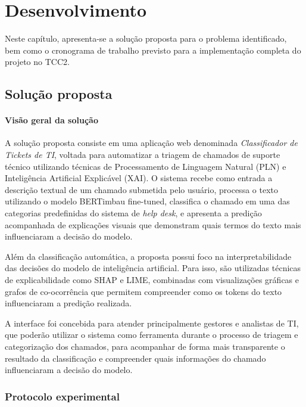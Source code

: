 \documentclass[
    12pt,                %
    openright,           %
    oneside,             %
    a4paper,             %
    english,             %
    brazil               %
]{abntex2}
\begin{document}
\chapter{Desenvolvimento}
\label{cap:desenvolvimento}

Neste capítulo, apresenta-se a solução proposta para o problema identificado, bem como o cronograma de trabalho previsto para a implementação completa do projeto no TCC2.

\section{Solução proposta}
\label{sec:solucao}

\subsubsection{Visão geral da solução}

A solução proposta consiste em uma aplicação web denominada \textit{Classificador de Tickets de TI}, voltada para automatizar a triagem de chamados de suporte técnico utilizando técnicas de Processamento de Linguagem Natural (PLN) e Inteligência Artificial Explicável (XAI). O sistema recebe como entrada a descrição textual de um chamado submetida pelo usuário, processa o texto utilizando o modelo BERTimbau fine-tuned, classifica o chamado em uma das categorias predefinidas do sistema de \textit{help desk}, e apresenta a predição acompanhada de explicações visuais que demonstram quais termos do texto mais influenciaram a decisão do modelo.

Além da classificação automática, a proposta possui foco na interpretabilidade das decisões do modelo de inteligência artificial. Para isso, são utilizadas técnicas de explicabilidade como SHAP e LIME, combinadas com visualizações gráficas e grafos de co-ocorrência que permitem compreender como os tokens do texto influenciaram a predição realizada.

A interface foi concebida para atender principalmente gestores e analistas de TI, que poderão utilizar o sistema como ferramenta durante o processo de triagem e categorização dos chamados, para acompanhar de forma mais transparente o resultado da classificação e compreender quais informações do chamado influenciaram a decisão do modelo.

\subsection{Protocolo experimental}
\label{subsec:experimentos}
\end{document}
